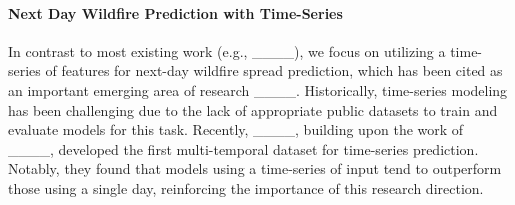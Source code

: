 \paragraph{Next Day Wildfire Prediction with Time-Series} In contrast to most existing work (e.g., ____), we focus on utilizing a time-series of features for next-day wildfire spread prediction, which has been cited as an important emerging area of research ____.  Historically, time-series modeling has been challenging due to the lack of appropriate public datasets to train and evaluate models for this task. Recently, ____, building upon the work of ____, developed the first multi-temporal dataset for time-series prediction.  Notably, they found that models using a time-series of input tend to outperform those using a single day, reinforcing the importance of this research direction. %